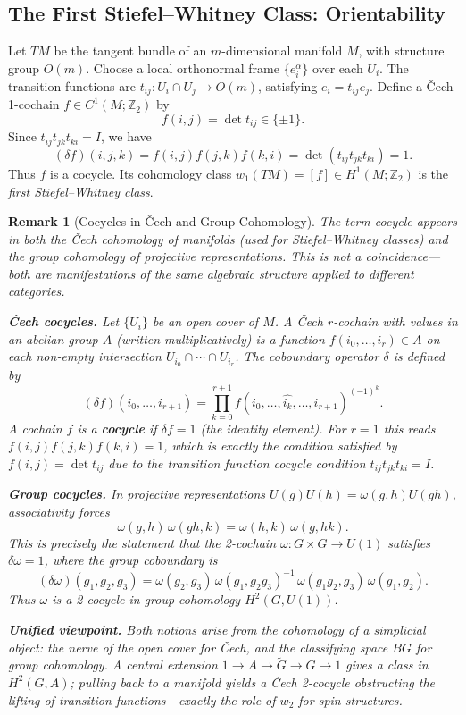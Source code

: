 \documentclass[11pt]{article}
\newcommand{\Z}{\mathbb{Z}}
\newtheorem{remark}[theorem]{Remark}
\begin{document}
\subsection{The First Stiefel--Whitney Class: Orientability}
Let \(TM\) be the tangent bundle of an \(m\)-dimensional manifold \(M\), with structure group \(O(m)\). Choose a local orthonormal frame \(\{e_i^\alpha\}\) over each \(U_i\). The transition functions are \(t_{ij}: U_i\cap U_j \to O(m)\), satisfying \(e_i = t_{ij} e_j\). Define a Čech 1-cochain \(f \in C^1(M;\Z_2)\) by
\[
f(i,j) = \det t_{ij} \in \{\pm 1\}.
\]
Since \(t_{ij}t_{jk}t_{ki} = I\), we have
\[
(\delta f)(i,j,k) = f(i,j)f(j,k)f(k,i) = \det(t_{ij}t_{jk}t_{ki}) = 1.
\]
Thus \(f\) is a cocycle. Its cohomology class \(w_1(TM) = [f] \in H^1(M;\Z_2)\) is the \emph{first Stiefel--Whitney class}.
\begin{remark}[Cocycles in \v{C}ech and Group Cohomology]
The term \emph{cocycle} appears in both the \v{C}ech cohomology of manifolds (used for Stiefel--Whitney classes) and the group cohomology of projective representations. This is not a coincidence---both are manifestations of the same algebraic structure applied to different categories.

\medskip
\noindent \textbf{\v{C}ech cocycles.} Let $\{U_i\}$ be an open cover of $M$. A \v{C}ech $r$-cochain with values in an abelian group $A$ (written multiplicatively) is a function $f(i_0,\dots,i_r) \in A$ on each non-empty intersection $U_{i_0}\cap\cdots\cap U_{i_r}$. The coboundary operator $\delta$ is defined by
\[
(\delta f)(i_0,\dots,i_{r+1}) = \prod_{k=0}^{r+1} f(i_0,\dots,\widehat{i_k},\dots,i_{r+1})^{(-1)^k}.
\]
A cochain $f$ is a \textbf{cocycle} if $\delta f = 1$ (the identity element). For $r=1$ this reads $f(i,j)f(j,k)f(k,i)=1$, which is exactly the condition satisfied by $f(i,j)=\det t_{ij}$ due to the transition function cocycle condition $t_{ij}t_{jk}t_{ki}=I$.

\medskip
\noindent \textbf{Group cocycles.} In projective representations $U(g)U(h)=\omega(g,h)U(gh)$, associativity forces
\[
\omega(g,h)\,\omega(gh,k) = \omega(h,k)\,\omega(g,hk).
\]
This is precisely the statement that the 2-cochain $\omega:G\times G\to U(1)$ satisfies $\delta\omega = 1$, where the group coboundary is
\[
(\delta\omega)(g_1,g_2,g_3) = \omega(g_2,g_3)\,\omega(g_1,g_2g_3)^{-1}\,\omega(g_1g_2,g_3)\,\omega(g_1,g_2).
\]
Thus $\omega$ is a 2-cocycle in group cohomology $H^2(G,U(1))$.

\medskip
\noindent \textbf{Unified viewpoint.} Both notions arise from the cohomology of a simplicial object: the nerve of the open cover for \v{C}ech, and the classifying space $BG$ for group cohomology. A central extension $1\to A\to \tilde{G}\to G\to 1$ gives a class in $H^2(G,A)$; pulling back to a manifold yields a \v{C}ech 2-cocycle obstructing the lifting of transition functions---exactly the role of $w_2$ for spin structures.
\end{remark}
\end{document}
